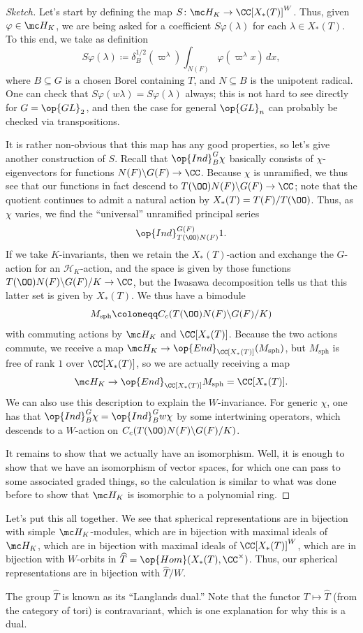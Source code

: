 \documentclass[../notes.tex]{subfiles}
\begin{document}
\begin{proof}[Sketch]
	Let's start by defining the map $S\colon\mc H_K\to\CC[X_*(T)]^W$. Thus, given $\varphi\in\mc H_K$, we are being asked for a coefficient $S\varphi(\lambda)$ for each $\lambda\in X_*(T)$. To this end, we take as definition
	\[S\varphi(\lambda)\coloneqq\delta_B^{1/2}(\varpi^\lambda)\int_{N(F)}\varphi\left(\varpi^\lambda x\right)\,dx,\]
	where $B\subseteq G$ is a chosen Borel containing $T$, and $N\subseteq B$ is the unipotent radical. One can check that $S\varphi(w\lambda)=S\varphi(\lambda)$ always; this is not hard to see directly for $G=\op{GL}_2$, and then the case for general $\op{GL}_n$ can probably be checked via transpositions.

	It is rather non-obvious that this map has any good properties, so let's give another construction of $S$. Recall that $\op{Ind}_B^G\chi$ basically consists of $\chi$-eigenvectors for functions $N(F)\backslash G(F)\to\CC$. Because $\chi$ is unramified, we thus see that our functions in fact descend to $T(\OO)N(F)\backslash G(F)\to\CC$; note that the quotient continues to admit a natural action by $X_*(T)=T(F)/T(\OO)$. Thus, as $\chi$ varies, we find the ``universal'' unramified principal series
	\[\op{Ind}^{G(F)}_{T(\OO)N(F)}1.\]
	If we take $K$-invariants, then we retain the $X_*(T)$-action and exchange the $G$-action for an $\mathcal H_K$-action, and the space is given by those functions $T(\OO)N(F)\backslash G(F)/K\to\CC$, but the Iwasawa decomposition tells us that this latter set is given by $X_*(T)$. We thus have a bimodule
	\[M_{\mathrm{sph}}\coloneqq C_c(T(\OO)N(F)\backslash G(F)/K)\]
	with commuting actions by $\mc H_K$ and $\CC[X_*(T)]$. Because the two actions commute, we receive a map $\mc H_K\to\op{End}_{\CC[X_*(T)]}(M_{\mathrm{sph}})$, but $M_{\mathrm{sph}}$ is free of rank $1$ over $\CC[X_*(T)]$, so we are actually receiving a map
	\[\mc H_K\to\op{End}_{\CC[X_*(T)]}M_{\mathrm{sph}}=\CC[X_*(T)].\]
	We can also use this description to explain the $W$-invariance. For generic $\chi$, one has that $\op{Ind}_B^G\chi=\op{Ind}_B^Gw\chi$ by some intertwining operators, which descends to a $W$-action on $C_c(T(\OO)N(F)\backslash G(F)/K)$.

	It remains to show that we actually have an isomorphism. Well, it is enough to show that we have an isomorphism of vector spaces, for which one can pass to some associated graded things, so the calculation is similar to what was done before to show that $\mc H_K$ is isomorphic to a polynomial ring.
\end{proof}
Let's put this all together. We see that spherical representations are in bijection with simple $\mc H_K$-modules, which are in bijection with maximal ideals of $\mc H_K$, which are in bijection with maximal ideals of $\CC[X_*(T)]^W$, which are in bijection with $W$-orbits in $\widehat T=\op{Hom}(X_*(T),\CC^\times)$. Thus, our spherical representations are in bijection with $\widehat T/W$.
\begin{remark}
	The group $\widehat T$ is known as its ``Langlands dual.'' Note that the functor $T\mapsto\widehat T$ (from the category of tori) is contravariant, which is one explanation for why this is a dual.
\end{remark}
\end{document}
